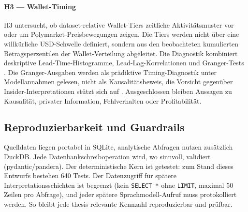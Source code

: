 \paragraph{H3 --- Wallet-Timing}
H3 untersucht, ob dataset-relative Wallet-Tiers zeitliche Aktivitätsmuster vor
oder um Polymarket-Preisbewegungen zeigen. Die Tiers werden nicht über eine
willkürliche USD-Schwelle definiert, sondern aus den beobachteten kumulierten
Betragsperzentilen der Wallet-Verteilung abgeleitet. Die Diagnostik kombiniert
deskriptive Lead-Time-Histogramme, Lead-Lag-Korrelationen und Granger-Tests
\citep{lit_granger_001}. Die Granger-Ausgaben werden als prädiktive
Timing-Diagnostik unter Modellannahmen gelesen, nicht als Kausalitätsbeweis,
die Vorsicht gegenüber Insider-Interpretationen stützt sich auf
\citet{zotero_poly_005}. Ausgeschlossen bleiben Aussagen zu Kausalität, privater
Information, Fehlverhalten oder Profitabilität.

\subsection{Reproduzierbarkeit und Guardrails}

Quelldaten liegen portabel in SQLite, analytische Abfragen nutzen zusätzlich
DuckDB. Jede Datenbankschreiboperation wird, wo sinnvoll, validiert
(pydantic/pandera). Der deterministische Kern ist getestet: zum Stand dieses
Entwurfs bestehen 640 Tests. Der Datenzugriff für spätere
Interpretationsschichten ist begrenzt (kein \texttt{SELECT *} ohne
\texttt{LIMIT}, maximal 50 Zeilen pro Abfrage), und jeder spätere
Sprachmodell-Aufruf muss protokolliert werden. So bleibt jede thesis-relevante Kennzahl reproduzierbar und prüfbar.
